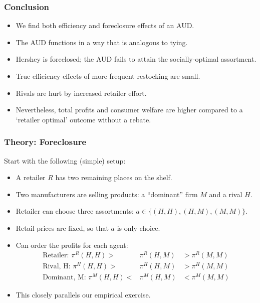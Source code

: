 \documentclass[aspectratio=169,11pt]{beamer}
\begin{document}
\begin{frame}
\frametitle{Conclusion}
\begin{itemize}
\item We find both efficiency and foreclosure effects of an AUD.
\item The AUD functions in a way that is analogous to tying.
\item Hershey is foreclosed; the AUD fails to attain the socially-optimal assortment.
\item True efficiency effects of more frequent restocking are small.
\item Rivals are hurt by increased retailer effort.
\item Nevertheless, total profits and consumer welfare are higher compared to a `retailer optimal' outcome without a rebate.
\end{itemize}
\end{frame}


\begin{frame}[label=supplemental]
\frametitle{Theory: Foreclosure}
Start with the following (simple) setup:
\begin{itemize}
\item A retailer $R$ has two remaining places on the shelf.
\item Two manufacturers are selling products: a ``dominant'' firm $M$ and a rival $H$.
\item Retailer can choose three assortments: $a \in \{ (H,H), (H,M), (M,M)\}$.
\item Retail prices are fixed, so that $a$ is only choice.
\item Can order the profits for each agent:
\begin{eqnarray*}
\label{profitorder}
\nonumber \text{Retailer:  } \pi^R(H,H) >& \pi^R(H,M) &> \pi^R(M,M)\\
\nonumber \text{Rival, H:  }\pi^H(H,H) >& \pi^H(H,M) &> \pi^H(M,M)\\
\text{Dominant, M:  }\pi^M(H,H) <& \pi^M(H,M) &<  \pi^M(M,M)
\end{eqnarray*}
\item This closely parallels our empirical exercise.
\end{itemize}
\end{frame}
\end{document}

